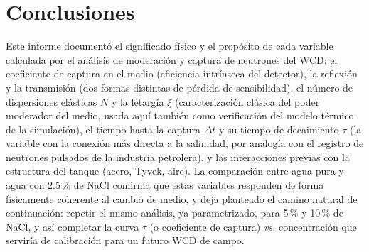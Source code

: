 \documentclass[11pt,a4paper]{article}
\begin{document}
\section{Conclusiones}

Este informe documentó el significado físico y el propósito de cada variable calculada por el
análisis de moderación y captura de neutrones del WCD: el coeficiente de captura en el medio
(eficiencia intrínseca del detector), la reflexión y la transmisión (dos formas distintas de pérdida
de sensibilidad), el número de dispersiones elásticas $N$ y la letargía $\xi$ (caracterización
clásica del poder moderador del medio, usada aquí también como verificación del modelo térmico de
la simulación), el tiempo hasta la captura $\Delta t$ y su tiempo de decaimiento $\tau$ (la variable
con la conexión más directa a la salinidad, por analogía con el registro de neutrones pulsados de
la industria petrolera), y las interacciones previas con la estructura del tanque (acero, Tyvek,
aire). La comparación entre agua pura y agua con 2.5\,\% de NaCl confirma que estas variables
responden de forma físicamente coherente al cambio de medio, y deja planteado el camino natural de
continuación: repetir el mismo análisis, ya parametrizado, para 5\,\% y 10\,\% de NaCl, y así
completar la curva $\tau$ (o coeficiente de captura) \textit{vs.} concentración que serviría de
calibración para un futuro WCD de campo.
\end{document}
